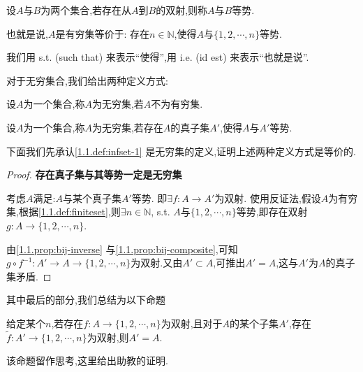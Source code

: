 \begin{definition}
    [等势] 设$A$与$B$为两个集合,若存在从$A$到$B$的双射,则称$A$与$B$等势.
\end{definition}

也就是说,$A$是有穷集等价于: 存在$n \in \mathbb{N}$,使得$A$与$\{1,2,\cdots,n\}$等势.

\begin{notation*}
    我们用 s.t. (such that) 来表示“使得”,用 i.e. (id est) 来表示“也就是说”.
\end{notation*}

对于无穷集合,我们给出两种定义方式:

\begin{definition}[无穷集]\label{1.1.def:infset-1} 设$A$为一个集合,称$A$为无穷集,若$A$不为有穷集.
\end{definition}

\begin{definition}[无穷集]\label{1.1.def:infset-2} 设$A$为一个集合,称$A$为无穷集,若存在$A$的真子集$A'$,使得$A$与$A'$等势.
\end{definition}

下面我们先承认\autoref{1.1.def:infset-1} 是无穷集的定义,证明上述两种定义方式是等价的.

\begin{proof}
    \textbf{存在真子集与其等势一定是无穷集}

    考虑$A$满足:$A$与某个真子集$A'$等势. 即$\exists f:A\to A'$为双射. 使用反证法,假设$A$为有穷集,根据\autoref{1.1.def:finiteset},则$\exists n \in \mathbb{N}$, s.t. $A$与$\{1,2,\cdots,n\}$等势,即存在双射$g:A \to \{1,2,\cdots,n\}$.

    由\autoref{1.1.prop:bij-inverse} 与\autoref{1.1.prop:bij-composite},可知$g \circ f^{-1}:A' \to A \to \{ 1,2,\cdots,n\}$为双射.又由$A' \subset A$,可推出$A' = A$,这与$A'$为$A$的真子集矛盾.
\end{proof}

其中最后的部分,我们总结为以下命题
\begin{proposition}
    给定某个$n$,若存在$f:A \to \{1,2,\cdots,n\}$为双射,且对于$A$的某个子集$A'$,存在$\tilde f:A' \to \{1,2,\cdots,n\}$为双射,则$A'=A$.
\end{proposition}

该命题留作思考,这里给出助教的证明.

